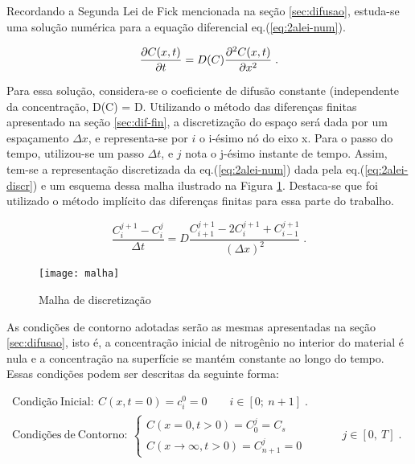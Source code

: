 Recordando a Segunda Lei de Fick mencionada na seção \ref{sec:difusao}, estuda-se uma solução numérica para a equação diferencial eq.(\ref{eq:2alei-num}).

\begin{equation}
\label{eq:2alei-num}
\pdv{C(x,t)}{t} = D(C)\pdv[2]{C(x,t)}{x} \;.
\end{equation}

Para essa solução, considera-se o coeficiente de difusão constante (independente da concentração, D(C) = D. Utilizando o método das diferenças finitas apresentado na seção \ref{sec:dif-fin}, a discretização do espaço será dada por um espaçamento {$\Delta x$}, e representa-se por $i$ o i-ésimo nó do eixo x. Para o passo do tempo, utilizou-se um passo {$\Delta t$}, e $j$ nota o j-ésimo instante de tempo. Assim, tem-se a representação discretizada da eq.(\ref{eq:2alei-num}) dada pela eq.(\ref{eq:2alei-discr}) e um esquema dessa malha ilustrado na Figura \ref{fig:malha}. Destaca-se que foi utilizado o método implícito das diferenças finitas para essa parte do trabalho.

\begin{equation}
\label{eq:2alei-discr}
\dfrac{C_i^{j+1} - C_i^j}{\Delta t} = D\dfrac{C_{i+1}^{j+1} - 2C_i^{j+1} + C_{i-1}^{j+1}}{(\Delta x)^2}  \;.
\end{equation}



\begin{figure}[ht]
	\caption{Malha de discretização}
	\texttt{[image: malha]}
	\label{fig:malha}
	\centering
	\end{figure}


As condições de contorno adotadas serão as mesmas apresentadas na seção \ref{sec:difusao}, isto é, a concentração inicial de nitrogênio no interior do material é nula e a concentração na superfície se mantém constante ao longo do tempo. Essas condições podem ser descritas da seguinte forma:

\begin{gather*}
		\mathrm{Condição\ Inicial: }\ C(x, t=0) = c_i^0 = 0 \qquad i \in [0;\ n+1] \;. \\
		\mathrm{Condições\ de\ Contorno:}\ 
		\left\{
    		\begin{array}{l}
      			C(x=0, t>0) = C_0^j = C_s  \\
				C(x\rightarrow\infty, t>0) = C_{n+1}^j = 0 
			\end{array}
    		\begin{array}{l}
      		\qquad \\
			\qquad \\	   
    		\end{array}
    		\begin{array}{l}
    			j \in [0,\ T] \;.
    		\end{array}
		\right.	
\end{gather*}



